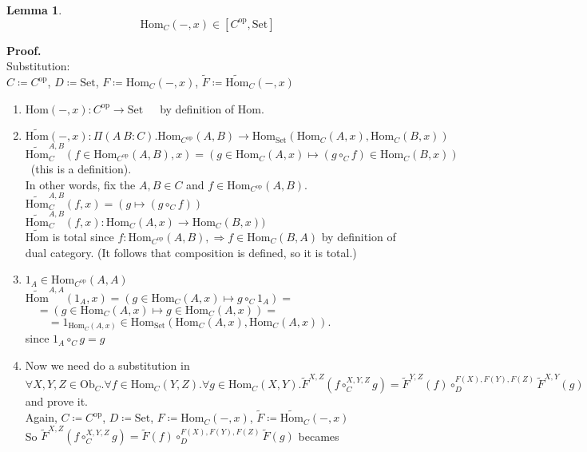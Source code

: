 \documentclass[10pt,a4paper]{article}
\theoremstyle{definition}
\newtheorem{lemma}{Lemma}[section]
\newcommand{\Ob}{{\textrm{Ob}}}
\newcommand{\Hom}{{\textrm{Hom}}}
\newcommand{\HomMor}{{\widetilde{\Hom}\textrm{}}}
\newcommand{\FMor}{{\widetilde{F}\textrm{}}}
\newcommand{\op}{{\textrm{op}}}
\newcommand{\Set}{{\textrm{Set}}}
\newcommand{\myprf}{\noindent\textbf{Proof.}}
\begin{document}
\begin{lemma}
$$\Hom_C(-, x) \in [C^\op,\Set]$$
\end{lemma}

\myprf\\
Substitution:\\
$C \coloneqq C^\op$, 
$D \coloneqq \Set$, 
$F \coloneqq \Hom_C(-,x)$, 
$\FMor \coloneqq \HomMor_C(-,x)$\\
\begin{enumerate}
\item $\Hom(-, x) : C^\op \to \Set$\ \ \ by definition of $\Hom$.
\item $\HomMor(-, x) :\Pi(A\ B:C).\Hom_{C^\op}(A,B) \to \Hom_\Set(\Hom_C(A,x), \Hom_C(B,x))$\\
$\HomMor_C^{A,B}(f\in\Hom_{C^\op}(A,B), x) = (g \in\Hom_C(A,x) \mapsto (g \circ_C f) \in\Hom_C(B,x))$\ (this is a definition).\\
In other words, fix the $A,B\in C$ and $f\in\Hom_{C^\op}(A,B)$.\\
$\HomMor_C^{A,B}(f, x) = (g\mapsto (g \circ_C f))$\\
$\HomMor_C^{A,B}(f, x) : \Hom_C(A,x) \to \Hom_C(B,x))$
\\
$\HomMor$ is total since $f:\Hom_{C^\op}(A,B), \Rightarrow f\in\Hom_C(B,A)$ by definition of dual category. (It follows that composition is defined, so it is total.)
\item $1_A\in\Hom_{C^\op}(A,A)$\\
$\HomMor^{A,A}(1_A, x) = \left(g \in\Hom_C(A,x)\mapsto g \circ_C 1_A\right) = $\\
$\quad = \left(g \in\Hom_C(A,x) \mapsto g \in\Hom_C(A,x)\right) =$\\
$\quad \quad = 1_{\Hom_C(A,x)} \in \Hom_\Set\left(\Hom_C(A,x), \Hom_C(A,x)\right).$\\
since $1_A \circ_C g = g$\\
\item Now we need do a substitution in
$\forall X,Y,Z \in \Ob_C.\forall f\in\Hom_C(Y,Z).\forall g\in\Hom_C(X,Y). \FMor^{X,Z}(f\circ_C^{X,Y,Z} g)=\FMor^{Y,Z}(f)\circ_D^{F(X),F(Y),F(Z)} \FMor^{X,Y}(g)$ and prove it.\\
Again, $C \coloneqq C^\op$, 
$D \coloneqq \Set$, 
$F \coloneqq \Hom_C(-,x)$, 
$\FMor \coloneqq \HomMor_C(-,x)$\\
So $\FMor^{X,Z}(f\circ_C^{X,Y,Z} g)=\FMor(f)\circ_D^{F(X),F(Y),F(Z)} \FMor(g)$ becames\\

\end{enumerate}
\end{document}
